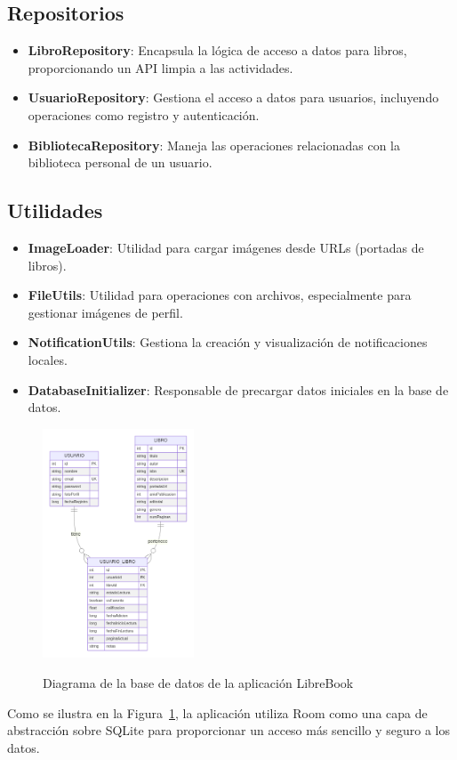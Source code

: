 \documentclass[a4paper,10pt]{report}
\begin{document}
      \subsection{Repositorios}
      \begin{itemize}
        \item \textbf{LibroRepository}: Encapsula la lógica de acceso a datos para libros, proporcionando un API limpia a las actividades.
        \item \textbf{UsuarioRepository}: Gestiona el acceso a datos para usuarios, incluyendo operaciones como registro y autenticación.
        \item \textbf{BibliotecaRepository}: Maneja las operaciones relacionadas con la biblioteca personal de un usuario.
      \end{itemize}
      \subsection{Utilidades}
      \begin{itemize}
        \item \textbf{ImageLoader}: Utilidad para cargar imágenes desde URLs (portadas de libros).
        \item \textbf{FileUtils}: Utilidad para operaciones con archivos, especialmente para gestionar imágenes de perfil.
        \item \textbf{NotificationUtils}: Gestiona la creación y visualización de notificaciones locales.
        \item \textbf{DatabaseInitializer}: Responsable de precargar datos iniciales en la base de datos.
      \end{itemize}
      \begin{figure}[H]
        \centering
        \href{https://raw.githubusercontent.com/Xabierland/DAS-Proyecto/refs/heads/main/Documentation/.img/diagrama-bd.svg}{%
          \includegraphics[width=0.4\textwidth]{.img/diagrama-bd.png}
        }
        \caption{Diagrama de la base de datos de la aplicación LibreBook}
        \label{fig:diagrama-bd}
      \end{figure}
      Como se ilustra en la Figura~\ref{fig:diagrama-bd}, la aplicación utiliza Room como una capa de abstracción sobre SQLite para proporcionar un acceso más sencillo y seguro a los datos.
\end{document}
